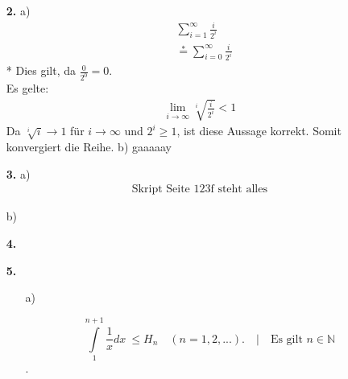 \documentclass[a4paper,11pt]{article}
\begin{document}
\begin{enumerate}
        \item[\textbf{2.}]
            \subitem a)
                \begin{align*}
                    &\sum_{i=1}^\infty \frac{i}{2^i}\\
                    &\overset{*}{=} \sum_{i=0}^\infty \frac{i}{2^i}
                \end{align*}
                * Dies gilt, da $\frac{0}{2^0} = 0$.\\
                Es gelte:
                \begin{align*}
                    \underset{i \to \infty}{\lim} \sqrt[i]{\frac{i}{2^i}} < 1
                \end{align*}
                Da $\sqrt[i]{i} \to 1$ für $i \to \infty$ und $2^i \geq 1$, ist diese Aussage korrekt. Somit konvergiert die Reihe.
            \subitem b)
                gaaaaay
        \item[\textbf{3.}]
            \subitem a)
                \begin{align*}
                    \text{Skript Seite 123f steht alles}
                \end{align*}

            \subitem b)

        \item[\textbf{4.}]
	\todo

        \item[\textbf{5.}]
            \begin{enumerate}

                \item[a)]

                        $$ \int\limits_{1}^{n+1}  \frac{1}{x} dx  \ \leq H_n \quad (n=1,2,...). \quad \Big| \quad \text{Es gilt }n \in \mathbb{N}$$ . 





\end{enumerate}
\end{enumerate}
\end{document}

